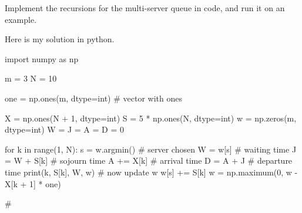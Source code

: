 \begin{exercise}\label{ex:23}
Implement the recursions for the multi-server queue in code, and run it on an example.
\begin{solution}
Here is my solution in python.
\begin{pyconsole}
import numpy as np

m = 3
N = 10

one = np.ones(m, dtype=int)  #  vector with ones

X = np.ones(N + 1, dtype=int)
S = 5 * np.ones(N, dtype=int)
w = np.zeros(m, dtype=int)
W = J = A = D = 0

for k in range(1, N):
    s = w.argmin()  # server chosen
    W = w[s]  # waiting time
    J = W + S[k]  # sojourn time
    A += X[k]  # arrival time
    D = A + J  # departure time
    print(k, S[k], W, w)
    # now update w
    w[s] += S[k]
    w = np.maximum(0, w - X[k + 1] * one)

#
\end{pyconsole}
\end{solution}
\end{exercise}


